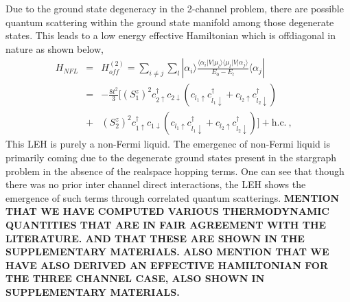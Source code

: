 \documentclass[reprint,prb,superscriptaddress]{revtex4-2}
\begin{document}
Due to the ground state degeneracy in the 2-channel problem, there are possible quantum scattering within the ground state manifold among those degenerate states. This leads to a low energy effective Hamiltonian which is offdiagonal in nature as shown below,
\begin{eqnarray}
H_{NFL}&=&H^{(2)}_{off} = \sum_{i\neq j} \sum_l |\alpha_i\rangle \frac{\langle \alpha_i  | V| \mu_l \rangle \langle \mu_l  | V| \alpha_j \rangle}{E_0-E_{l}}\langle \alpha_j | \nonumber\\
&=& -\frac{8t^2}{3} [ (S_1^z)^2 c_{2\uparrow}^{\dagger}c_{2\downarrow}  (  c_{l_1\uparrow}c_{l_1\downarrow}^{\dagger} +  c_{l_2\uparrow}c_{l_2\downarrow}^{\dagger}  ) \nonumber\\
&+& (S_2^z)^2 c_{1\uparrow}^{\dagger}c_{1\downarrow}  (  c_{l_1\uparrow}c_{l_1\downarrow}^{\dagger} +  c_{l_2\uparrow}c_{l_2\downarrow}^{\dagger}  ) ] + \textrm{h.c.} ~,~~~~
\label{eq:hamiltonian_NFL}
\end{eqnarray}
This LEH is purely a non-Fermi liquid. The emergenec of non-Fermi liquid is primarily coming due to the degenerate ground states present in the stargraph problem in the absence of the realspace hopping terms. One can see that though there was no prior inter channel direct interactions, the LEH shows the emergence of such terms through correlated quantum scatterings. \textbf{MENTION THAT WE HAVE COMPUTED VARIOUS THERMODYNAMIC QUANTITIES THAT ARE IN FAIR AGREEMENT WITH THE LITERATURE. AND THAT THESE ARE SHOWN IN THE SUPPLEMENTARY MATERIALS. ALSO MENTION THAT WE HAVE ALSO DERIVED AN EFFECTIVE HAMILTONIAN FOR THE THREE CHANNEL CASE, ALSO SHOWN IN SUPPLEMENTARY MATERIALS.}
\end{document}
